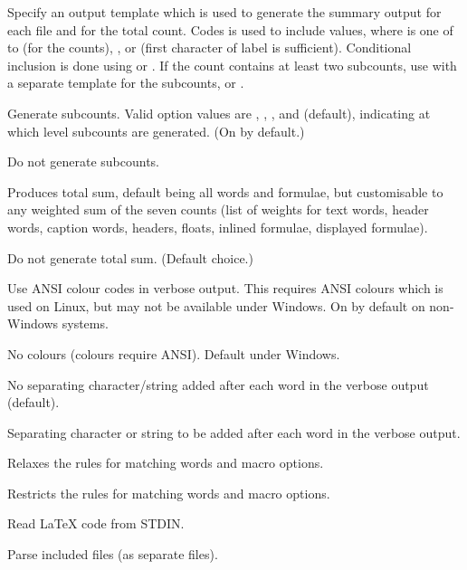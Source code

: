 \begin{description}
\option[-template="\ldots"]Specify an output template which is used to generate the summary output for each file and for the total count. Codes  is used to include values, where  is one of  to  (for the counts), ,  or  (first character of label is sufficient). Conditional inclusion is done using  or . If the count contains at least two subcounts, use  with a separate template for the subcounts, or .

\option[-sub\alt{=\ldots}, -subcount\alt{=\ldots}]Generate subcounts. Valid option values are , , ,  and  (default), indicating at which level subcounts are generated. (On by default.)

\option[-nosub]Do not generate subcounts.

\option[-sum\alt{=n,n,\ldots}]Produces total sum, default being all words and formulae, but customisable to any weighted sum of the seven counts (list of weights for text words, header words, caption words, headers, floats, inlined formulae, displayed formulae).

\option[-nosum]Do not generate total sum. (Default choice.)

\option[-col]Use ANSI colour codes in verbose output. This requires ANSI colours which is used on Linux, but may not be available under Windows. On by default on non-Windows systems. 

\option[-nc, -nocol]No colours (colours require ANSI). Default under Windows.

No separating character/string added after each word in the verbose output (default).

\option[-sep=, -separator=]Separating character or string to be added after each word in the verbose output.

\option[-relaxed]Relaxes the rules for matching words and macro options.

\option[-restricted]Restricts the rules for matching words and macro options.

\option[-]Read \LaTeX{} code from STDIN.

\option[-inc]Parse included files (as separate files).


\end{description}
